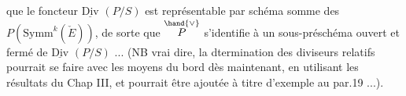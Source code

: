  que le foncteur $\underline{\mathrm{Div}}$ $(P/S)$ est représentable par schéma somme
des $P(\mathrm{Symm}^{k}(\check{E}))$, de sorte que $\overset{\hand{\vee}}{P}$ s'identifie à un sous-préschéma ouvert
et fermé de $\underline{\mathrm{Div}}$ $(P/S)$ ... (NB  vrai dire, la dtermination des diviseurs
 relatifs pourrait se faire avec les moyens du bord dès maintenant, en
 utilisant les résultats du Chap III, et pourrait être ajoutée  à titre
 d'exemple au par.19 ...).

